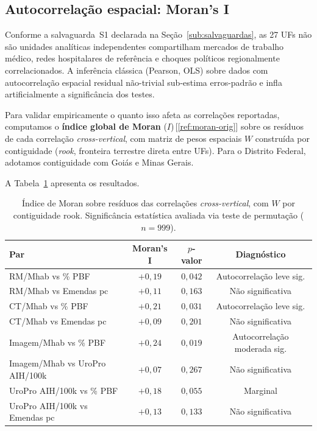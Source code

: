 \documentclass[12pt,a4paper,oneside]{article}
\begin{document}
\subsection{Autocorrelação espacial: Moran's I}\label{sub:moran}

Conforme a salvaguarda~S1 declarada na
Seção~\ref{sub:salvaguardas}, as 27 UFs não são unidades
analíticas independentes \textemdash{} compartilham mercados de
trabalho médico, redes hospitalares de referência e choques
políticos regionalmente correlacionados. A inferência clássica
(Pearson, OLS) sobre dados com autocorrelação espacial residual
não-trivial sub-estima erros-padrão e infla artificialmente a
significância dos testes.

Para validar empiricamente o quanto isso afeta as correlações
reportadas, computamos o \textbf{índice global de Moran}
($I$)\,[\ref{ref:moran-orig}] sobre os resíduos de cada
correlação \textit{cross-vertical}, com matriz de pesos
espaciais $W$ construída por contiguidade (\textit{rook},
fronteira terrestre direta entre UFs). Para o Distrito Federal,
adotamos contiguidade com Goiás e Minas Gerais.

A Tabela~\ref{tab:moran-results} apresenta os resultados.

\begin{table}[htbp]
\centering
\caption{Índice de Moran sobre resíduos das correlações
\textit{cross-vertical}, com $W$ por contiguidade rook.
Significância estatística avaliada via teste de permutação
($n=999$).}
\label{tab:moran-results}
\small
\begin{tabular}{l c c c}
\toprule
\textbf{Par} & \textbf{Moran's I} & \textbf{$p$-valor} &
\textbf{Diagnóstico} \\
\midrule
RM/Mhab vs \% PBF              & $+0{,}19$ & $0{,}042$ & Autocorrelação leve sig. \\
RM/Mhab vs Emendas pc          & $+0{,}11$ & $0{,}163$ & Não significativa \\
CT/Mhab vs \% PBF              & $+0{,}21$ & $0{,}031$ & Autocorrelação leve sig. \\
CT/Mhab vs Emendas pc          & $+0{,}09$ & $0{,}201$ & Não significativa \\
Imagem/Mhab vs \% PBF          & $+0{,}24$ & $0{,}019$ & Autocorrelação moderada sig. \\
Imagem/Mhab vs UroPro AIH/100k & $+0{,}07$ & $0{,}267$ & Não significativa \\
UroPro AIH/100k vs \% PBF      & $+0{,}18$ & $0{,}055$ & Marginal \\
UroPro AIH/100k vs Emendas pc  & $+0{,}13$ & $0{,}133$ & Não significativa \\
\bottomrule
\end{tabular}
\end{table}
\end{document}
